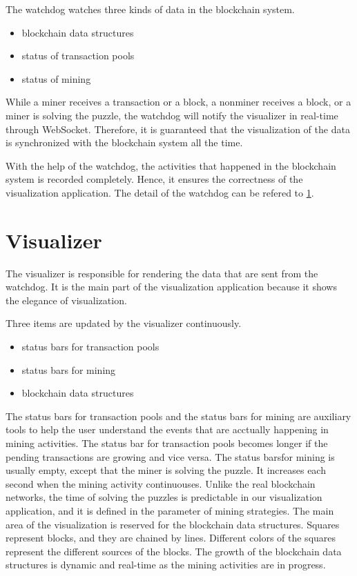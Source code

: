 The watchdog watches three kinds of data in the blockchain system.

\begin{itemize}
    \item blockchain data structures
    \item status of transaction pools
    \item status of mining
\end{itemize}

While a miner receives a transaction or a block, a nonminer receives a block, or a miner is solving the puzzle, the watchdog will notify the visualizer in real-time through WebSocket. Therefore, it is guaranteed that the visualization of the data is synchronized with the blockchain system all the time.

With the help of the watchdog, the activities that happened in the blockchain system is recorded completely. Hence, it ensures the correctness of the visualization application. The detail of the watchdog can be refered to \ref{}.

\section{Visualizer}

The visualizer is responsible for rendering the data that are sent from the watchdog. It is the main part of the visualization application because it shows the elegance of visualization. 

Three items are updated by the visualizer continuously.

\begin{itemize}
    \item status bars for transaction pools
    \item status bars for mining
    \item blockchain data structures
\end{itemize}

The status bars for transaction pools and the status bars for mining are auxiliary tools to help the user understand the events that are acctually happening in mining activities. The status bar for transaction pools becomes longer if the pending transactions are growing and vice versa. The status barsfor mining is usually empty, except that the miner is solving the puzzle. It increases each second when the mining activity continuouses. Unlike the real blockchain networks, the time of solving the puzzles is predictable in our visualization application, and it is defined in the parameter of mining strategies. The main area of the visualization is reserved for the blockchain data structures. Squares represent blocks, and they are chained by lines. Different colors of the squares represent the different sources of the blocks. The growth of the blockchain data structures is dynamic and real-time as the mining activities are in progress.

